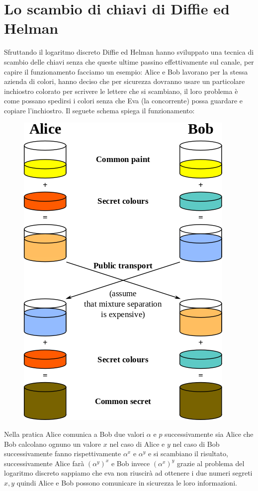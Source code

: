 \documentclass[10pt,a4paper]{article}
\begin{document}
\section{Lo scambio di chiavi di Diffie ed Helman}
Sfruttando il logaritmo discreto Diffie ed Helman hanno sviluppato una tecnica di scambio delle chiavi senza che queste ultime passino effettivamente sul canale, per capire il funzionamento facciamo un esempio: Alice e Bob lavorano per la stessa azienda di colori, hanno deciso che per sicurezza dovranno usare un particolare inchiostro colorato per scrivere le lettere che si scambiano, il loro problema è come possano spedirsi i colori senza che Eva (la concorrente) possa guardare e copiare l'inchiostro. Il seguete schema spiega il funzionamento:
\begin{figure}[htbp]
\includegraphics[scale=0.6]{immagini/scambioChiavi.png}
\end{figure}

Nella pratica Alice comunica a Bob due valori $\alpha$ e $p$ successivamente sia Alice che Bob calcolano ognuno un valore $x$ nel caso di Alice e $y$ nel caso di Bob successivamente fanno rispettivamente  $\alpha^x$ e $\alpha^y$ e si scambiano il risultato, successivamente Alice farà $(\alpha^y)^x$ e Bob invece $(\alpha^x)^y$ grazie al problema del logaritmo discreto sappiamo che eva non riuscirà ad ottenere i due numeri segreti $x,y$ quindi Alice e Bob possono comunicare in sicurezza le loro informazioni.
\end{document}
